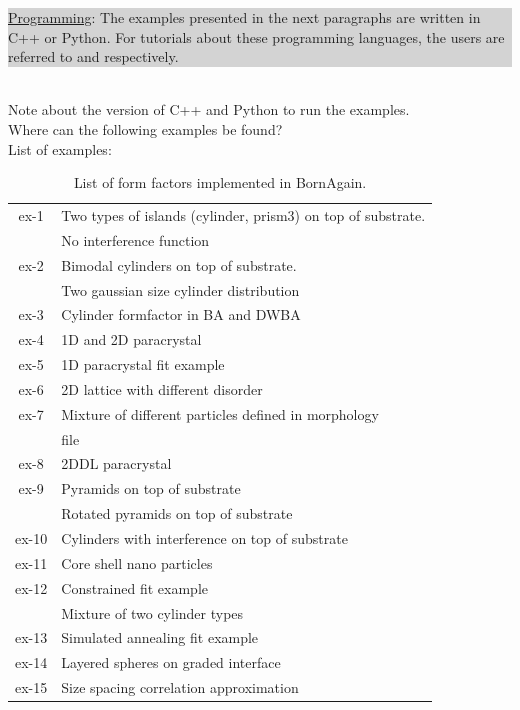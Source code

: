 \noindent \smallpencil \colorbox{Lightgray}{\parbox{\dimexpr\linewidth-8\fboxsep}
{\underline{Programming}: The examples presented in the next
  paragraphs are written in C++ or Python. For tutorials about these
   programming languages, the users are referred to
  \cite{Cppref} and \cite{Pythonref} respectively.}}\\

\noindent Note about the version of C++ and Python to run the
examples.\\

\noindent Where can the following examples be found?\\

\noindent List of examples:

\begin{table}
\begin{tabular}{|c|l|}
\hline
ex-1 &	Two types of islands (cylinder, prism3) on top of substrate.\\
& No interference function \\
\hline
 ex-2 &	Bimodal cylinders on top of substrate.\\
         & Two gaussian size cylinder distribution \\	
\hline
ex-3 &	Cylinder formfactor in BA and DWBA \\
\hline
ex-4 &	1D and 2D paracrystal \\
\hline
ex-5 &	1D paracrystal fit example\\
\hline
ex-6 &	2D lattice with different disorder\\
\hline
ex-7 &	Mixture of different particles defined in morphology\\
                  & file \\
\hline
ex-8 &	2DDL paracrystal\\
\hline
ex-9 & 	Pyramids on top of substrate \\
                  & Rotated pyramids on top of substrate \\
\hline
ex-10 &	Cylinders with interference on top of substrate\\
\hline
ex-11 &	Core shell nano particles\\
\hline
ex-12 &	Constrained fit example\\
           & Mixture of two cylinder types \\
\hline
ex-13 &	Simulated annealing fit example \\
\hline
ex-14 &	Layered spheres on graded interface \\
\hline
ex-15 &	Size spacing correlation approximation \\
\hline
\end{tabular}
\caption{List of form factors implemented in BornAgain.}
\end{table}

